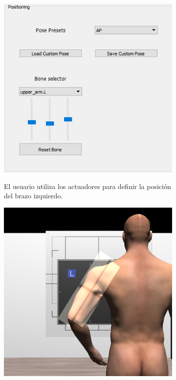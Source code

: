 

\begin{figure}[h]
    \begin{subfigure}[b]{0.45\linewidth}
        \centering
        {\includegraphics[width=\linewidth]{IMG/PoseUI.png}}
        \caption{El usuario utiliza los actuadores para definir la posición del brazo izquierdo. \label{subfig:position}}
    \end{subfigure}
    \null\hfill
     \begin{subfigure}[b]{0.45\linewidth}
        \centering
        {\includegraphics[width=\linewidth]{IMG/PoseArm.png}}

\end{subfigure}
\end{figure}
